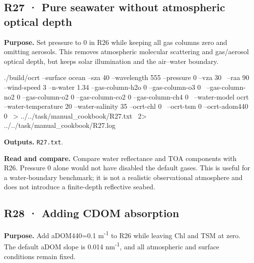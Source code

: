 
\subsection{R27 · Pure seawater without atmospheric optical depth}
\label{sec:auto:09_cookbook:6.2}

\label{recipe:R27}

\textbf{Purpose. }Set pressure to 0 in R26 while keeping all gas columns zero and omitting aerosols. This removes atmospheric molecular scattering and gas/aerosol optical depth, but keeps solar illumination and the air–water boundary.

\noindent\begin{minipage}{\linewidth}
\begin{ManualCode}

./build/ocrt --surface ocean --sza 40 --wavelength 555 --pressure 0 --vza 30 \
  --raa 90 --wind-speed 3 --n-water 1.34 --gas-column-h2o 0 --gas-column-o3 0 \
  --gas-column-no2 0 --gas-column-o2 0 --gas-column-co2 0 --gas-column-ch4 0 \
  --water-model ocrt --water-temperature 20 --water-salinity 35 --ocrt-chl 0 \
  --ocrt-tsm 0 --ocrt-adom440 0 \
  > ../../task/manual_cookbook/R27.txt \
  2> ../../task/manual_cookbook/R27.log

\end{ManualCode}
\end{minipage}\par

\textbf{Outputs. }\texttt{R27.txt}.

\textbf{Read and compare. }Compare water reflectance and TOA components with R26. Pressure 0 alone would not have disabled the default gases. This is useful for a water-boundary benchmark; it is not a realistic observational atmosphere and does not introduce a finite-depth reflective seabed.


\subsection{R28 · Adding CDOM absorption}
\label{sec:auto:09_cookbook:6.3}

\label{recipe:R28}

\textbf{Purpose. }Add aDOM440=0.1 m\textsuperscript{-1} to R26 while leaving Chl and TSM at zero. The default aDOM slope is 0.014 nm\textsuperscript{-1}, and all atmospheric and surface conditions remain fixed.

